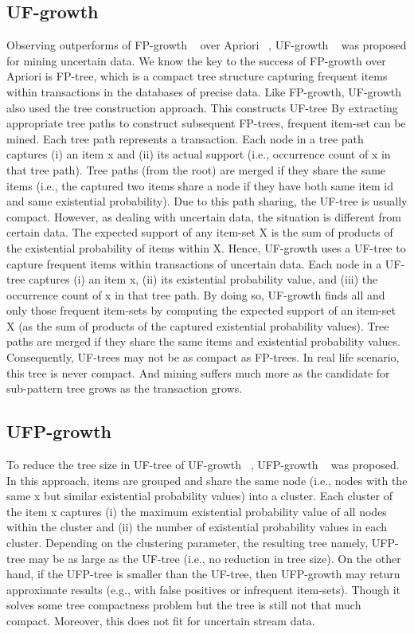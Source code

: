     \subsection{UF-growth}
    Observing outperforms of FP-growth ~\cite{fp_growth} over Apriori ~\cite{apriori}, UF-growth ~\cite{uf_growth} was proposed for mining uncertain data. We know the key to the success of FP-growth over Apriori is FP-tree, which is a compact tree structure capturing frequent items within transactions in the databases of precise data. Like FP-growth, UF-growth also used the tree construction approach. This constructs UF-tree By extracting appropriate tree paths to construct subsequent FP-trees, frequent item-set can be mined. Each tree path represents a transaction. Each node in a tree path captures (i) an item x and (ii) its actual support (i.e., occurrence count of x in that tree path). Tree paths (from the root) are merged if they share the same items (i.e., the captured two items share a node if they have both same item id and same existential probability). Due to this path sharing, the UF-tree is usually compact. However, as dealing with uncertain data, the situation is different from certain data. The expected support of any item-set X is the sum of products of the existential probability of items within X. Hence, UF-growth uses a UF-tree to capture frequent items within transactions of uncertain data. Each node in a UF-tree captures (i) an item x, (ii) its existential probability value, and (iii) the occurrence count of x in that tree path. By doing so, UF-growth ﬁnds all and only those frequent item-sets by computing the expected support of an item-set X (as the sum of products of the captured existential probability values). Tree paths are merged if they share the same items and existential probability values. Consequently, UF-trees may not be as compact as FP-trees. In real life scenario, this tree is never compact. And mining suffers much more as the candidate for sub-pattern tree grows as the transaction grows.
    
    \subsection{UFP-growth}
    To reduce the tree size in UF-tree of UF-growth ~\cite{uf_growth}, UFP-growth ~\cite{ufp_growth} was proposed. In this approach, items are grouped and share the same node (i.e., nodes with the same x but similar existential probability values) into a cluster. Each cluster of the item x captures (i) the maximum existential probability value of all nodes within the cluster and (ii) the number of existential probability values in each cluster. Depending on the clustering parameter, the resulting tree namely, UFP-tree may be as large as the UF-tree (i.e., no reduction in tree size). On the other hand, if the UFP-tree  is smaller than the UF-tree, then UFP-growth may return approximate results (e.g., with false positives or infrequent item-sets). Though it solves some tree compactness problem but the tree is still not that much compact. Moreover, this does not fit for uncertain stream data. 
    
